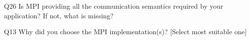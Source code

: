 \begin{description}%
\item{Q26} Is MPI providing all the communication semantics required by your application? If not, what is missing?%
\item{Q13} Why did you choose the MPI implementation(s)? [Select most suitable one]%
\end{description}%
